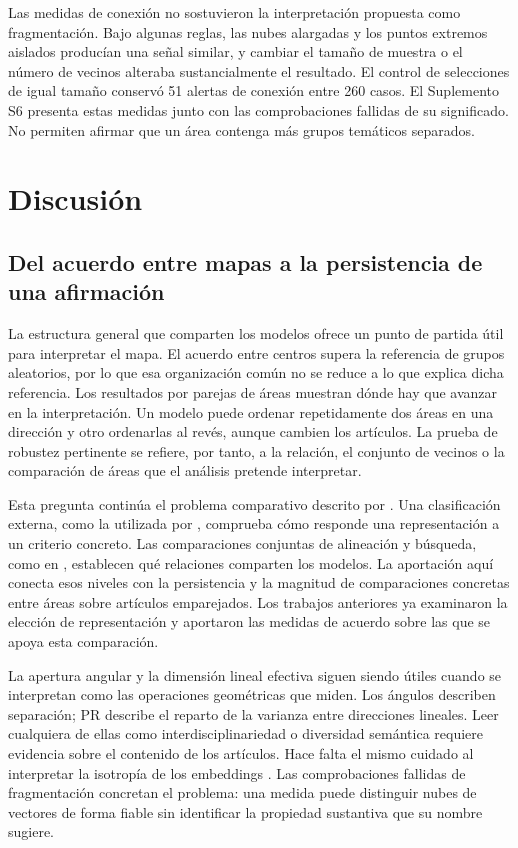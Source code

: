 \documentclass[12pt]{article}
\begin{document}
Las medidas de conexión no sostuvieron la interpretación propuesta como fragmentación. Bajo algunas reglas, las nubes alargadas y los puntos extremos aislados producían una señal similar, y cambiar el tamaño de muestra o el número de vecinos alteraba sustancialmente el resultado. El control de selecciones de igual tamaño conservó 51 alertas de conexión entre 260 casos. El Suplemento S6 presenta estas medidas junto con las comprobaciones fallidas de su significado. No permiten afirmar que un área contenga más grupos temáticos separados.

\section{Discusión}
\subsection{Del acuerdo entre mapas a la persistencia de una afirmación}
La estructura general que comparten los modelos ofrece un punto de partida útil para interpretar el mapa. El acuerdo entre centros supera la referencia de grupos aleatorios, por lo que esa organización común no se reduce a lo que explica dicha referencia. Los resultados por parejas de áreas muestran dónde hay que avanzar en la interpretación. Un modelo puede ordenar repetidamente dos áreas en una dirección y otro ordenarlas al revés, aunque cambien los artículos. La prueba de robustez pertinente se refiere, por tanto, a la relación, el conjunto de vecinos o la comparación de áreas que el análisis pretende interpretar.

Esta pregunta continúa el problema comparativo descrito por \citet{refa0d2d707e6,ref6a2f5912bc}. Una clasificación externa, como la utilizada por \citet{refc0e2cc29e0}, comprueba cómo responde una representación a un criterio concreto. Las comparaciones conjuntas de alineación y búsqueda, como en \citet{ref4e1e0d5582}, establecen qué relaciones comparten los modelos. La aportación aquí conecta esos niveles con la persistencia y la magnitud de comparaciones concretas entre áreas sobre artículos emparejados. Los trabajos anteriores ya examinaron la elección de representación y aportaron las medidas de acuerdo sobre las que se apoya esta comparación.

La apertura angular y la dimensión lineal efectiva siguen siendo útiles cuando se interpretan como las operaciones geométricas que miden. Los ángulos describen separación; PR describe el reparto de la varianza entre direcciones lineales. Leer cualquiera de ellas como interdisciplinariedad o diversidad semántica requiere evidencia sobre el contenido de los artículos. Hace falta el mismo cuidado al interpretar la isotropía de los embeddings \citep{rudman-etal-2022-isoscore}. Las comprobaciones fallidas de fragmentación concretan el problema: una medida puede distinguir nubes de vectores de forma fiable sin identificar la propiedad sustantiva que su nombre sugiere.
\end{document}
